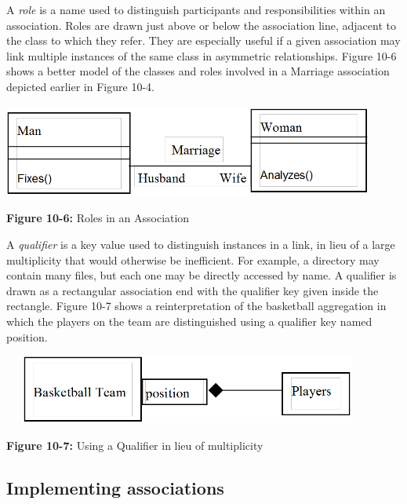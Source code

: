A \textit{role} is a name used to distinguish
participants and responsibilities within an association. Roles are
drawn just above or below the association line, adjacent to the class
to which they refer. They are especially useful if a given association
may link multiple instances of the same class in asymmetric
relationships. Figure 10-6 shows a better model of the classes and
roles involved in a Marriage association depicted earlier in Figure
10-4.

\bigskip

\includegraphics[width=4.8in,height=1.2in]{ub-img/roles.png}


{\sffamily\bfseries Figure 10-6:}
{\sffamily Roles in an Association}

\bigskip

A \textit{qualifier} is a key value used to
distinguish instances in a link, in lieu of a large
multiplicity that would otherwise be inefficient. For example, a
directory may contain many files, but each one may be directly accessed
by name. A qualifier is drawn as a rectangular association end with the
qualifier key given inside the rectangle. Figure 10-7 shows a
reinterpretation of the basketball aggregation in which the players on
the team are distinguished using a qualifier key named position.


\bigskip

\includegraphics[width=4.8in,height=0.9in]{ub-img/qualifier.png}

{\sffamily\bfseries Figure 10-7:}
{\sffamily Using a Qualifier in lieu of multiplicity}

\subsection{Implementing associations}

